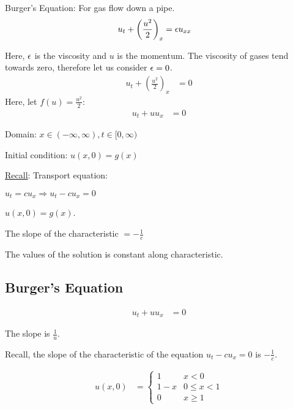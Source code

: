   \ex Burger's Equation: For gas flow down a pipe.
  \begin{align}
    u_t + \left( \frac{u^2}{2} \right)_x & = \epsilon u_{xx}
  \end{align}

  Here, $\epsilon$ is the viscosity and $u$ is the momentum. The viscosity of gases tend towards zero, therefore let us consider $\epsilon = 0$.
  \begin{align}
    u_t + \left( \frac{u^2}{2} \right)_x & = 0
  \end{align}
  Here, let $f(u) = \frac{u^2}{2}$:
  \begin{align}
    u_t + u u_x & = 0
  \end{align}

  Domain: $x \in (-\infty, \infty), t \in [0, \infty)$

  Initial condition: $u(x, 0) = g(x)$

  \underline{Recall}: Transport equation:

  $u_t = cu_x \Rightarrow u_t - cu_x = 0$

  $u(x, 0) = g(x)$.

  The slope of the characteristic $ = -\frac{1}{c}$

  The values of the solution is constant along characteristic.


  \subsection{Burger's Equation}
  \begin{align}
    u_t + uu_x & = 0
  \end{align}

  The slope is $\frac{1}{u}$.

  Recall, the slope of the characteristic of the equation $u_t - cu_x = 0$ is $-\frac{1}{c}$.

  \ex
  \begin{align}
    u(x, 0) & =
    \begin{cases}
      1     &         x < 0\\
      1 - x & 0 \leq  x < 1\\
      0     & x \geq  1
    \end{cases}
  \end{align}


